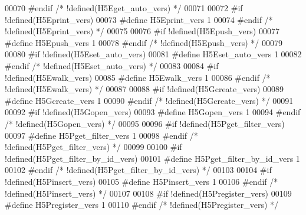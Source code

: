 \begin{DoxyCode}
00070 \textcolor{preprocessor}{#endif }\textcolor{comment}{/* !defined(H5Eget\_auto\_vers) */}\textcolor{preprocessor}{}
00071 
00072 \textcolor{preprocessor}{#if !defined(H5Eprint\_vers)}
00073 \textcolor{preprocessor}{  #define H5Eprint\_vers 1}
00074 \textcolor{preprocessor}{#endif }\textcolor{comment}{/* !defined(H5Eprint\_vers) */}\textcolor{preprocessor}{}
00075 
00076 \textcolor{preprocessor}{#if !defined(H5Epush\_vers)}
00077 \textcolor{preprocessor}{  #define H5Epush\_vers 1}
00078 \textcolor{preprocessor}{#endif }\textcolor{comment}{/* !defined(H5Epush\_vers) */}\textcolor{preprocessor}{}
00079 
00080 \textcolor{preprocessor}{#if !defined(H5Eset\_auto\_vers)}
00081 \textcolor{preprocessor}{  #define H5Eset\_auto\_vers 1}
00082 \textcolor{preprocessor}{#endif }\textcolor{comment}{/* !defined(H5Eset\_auto\_vers) */}\textcolor{preprocessor}{}
00083 
00084 \textcolor{preprocessor}{#if !defined(H5Ewalk\_vers)}
00085 \textcolor{preprocessor}{  #define H5Ewalk\_vers 1}
00086 \textcolor{preprocessor}{#endif }\textcolor{comment}{/* !defined(H5Ewalk\_vers) */}\textcolor{preprocessor}{}
00087 
00088 \textcolor{preprocessor}{#if !defined(H5Gcreate\_vers)}
00089 \textcolor{preprocessor}{  #define H5Gcreate\_vers 1}
00090 \textcolor{preprocessor}{#endif }\textcolor{comment}{/* !defined(H5Gcreate\_vers) */}\textcolor{preprocessor}{}
00091 
00092 \textcolor{preprocessor}{#if !defined(H5Gopen\_vers)}
00093 \textcolor{preprocessor}{  #define H5Gopen\_vers 1}
00094 \textcolor{preprocessor}{#endif }\textcolor{comment}{/* !defined(H5Gopen\_vers) */}\textcolor{preprocessor}{}
00095 
00096 \textcolor{preprocessor}{#if !defined(H5Pget\_filter\_vers)}
00097 \textcolor{preprocessor}{  #define H5Pget\_filter\_vers 1}
00098 \textcolor{preprocessor}{#endif }\textcolor{comment}{/* !defined(H5Pget\_filter\_vers) */}\textcolor{preprocessor}{}
00099 
00100 \textcolor{preprocessor}{#if !defined(H5Pget\_filter\_by\_id\_vers)}
00101 \textcolor{preprocessor}{  #define H5Pget\_filter\_by\_id\_vers 1}
00102 \textcolor{preprocessor}{#endif }\textcolor{comment}{/* !defined(H5Pget\_filter\_by\_id\_vers) */}\textcolor{preprocessor}{}
00103 
00104 \textcolor{preprocessor}{#if !defined(H5Pinsert\_vers)}
00105 \textcolor{preprocessor}{  #define H5Pinsert\_vers 1}
00106 \textcolor{preprocessor}{#endif }\textcolor{comment}{/* !defined(H5Pinsert\_vers) */}\textcolor{preprocessor}{}
00107 
00108 \textcolor{preprocessor}{#if !defined(H5Pregister\_vers)}
00109 \textcolor{preprocessor}{  #define H5Pregister\_vers 1}
00110 \textcolor{preprocessor}{#endif }\textcolor{comment}{/* !defined(H5Pregister\_vers) */}\textcolor{preprocessor}{}

\end{DoxyCode}
